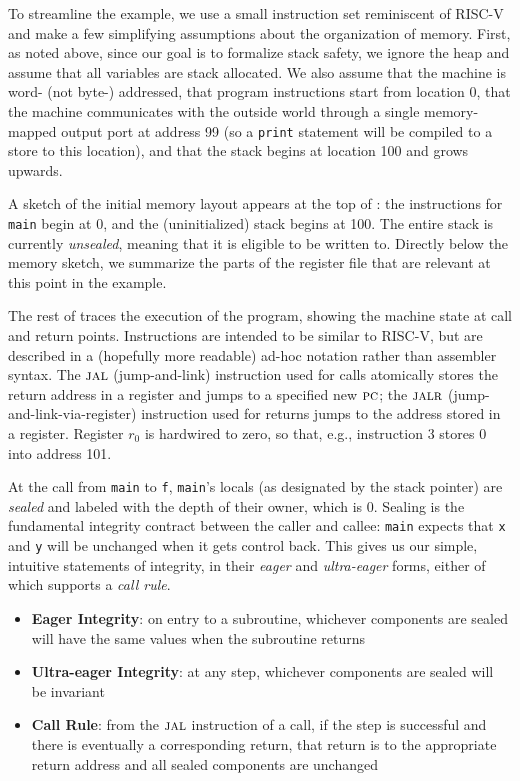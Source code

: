 To streamline the example, we use a small instruction set reminiscent of
RISC-V and make a few simplifying assumptions about the organization of
memory.
%
First, as noted above, since our goal is to formalize stack safety, we
ignore the heap and assume that all variables are stack allocated.
%
We also assume that the machine is word- (not byte-) addressed, that program
instructions start from location 0, that the machine communicates with the
outside world through a single memory-mapped output port at address 99 (so
a {\tt print} statement will be compiled to a store to this
location), and that the stack begins at location 100 and grows upwards.

A sketch of the initial memory layout appears at the top of
: the instructions for {\tt main} begin at 0,
and the (uninitialized) stack begins at 100. The entire stack is currently
{\em unsealed}, meaning that it is eligible to be written to.
Directly below the memory sketch, we summarize the parts
of the register file that are relevant at this point in the example.

The rest of  traces the execution of the
program, showing the machine state at call and return points.
Instructions are intended to be similar to RISC-V, but are described
in a (hopefully more readable) ad-hoc notation rather than assembler
syntax. The $\textsc{jal}$ (jump-and-link) instruction used for calls atomically
stores the return address in a register and jumps to a specified new $\textsc{pc}$;
the $\textsc{jalr}$ (jump-and-link-via-register) instruction used for returns jumps
to the address stored in a register. Register $r_0$ is hardwired to zero,
so that, e.g., instruction 3 stores $0$ into address 101.

At the call from {\tt main} to {\tt f}, {\tt main}'s locals (as
designated by the stack pointer) are {\em sealed} and labeled with the depth
of their owner, which is 0. Sealing is the fundamental integrity contract
between the caller and callee: {\tt main} expects that {\tt x} and {\tt y}
will be unchanged when it gets control back. This gives us our simple,
intuitive statements of integrity, in their {\em eager} and {\em ultra-eager}
forms, either of which supports a {\em call rule}.

\begin{itemize}
\item {\bf Eager Integrity}: on entry to a subroutine, whichever components are
  sealed will have the same values when the subroutine returns
\item {\bf Ultra-eager Integrity}: at any step, whichever components are sealed
  will be invariant
\item {\bf Call Rule}: from the \(\textsc{jal}\) instruction of a call, if the step is
  successful and there is eventually a corresponding return, that return is to
  the appropriate return address and all sealed components are unchanged
\end{itemize}

